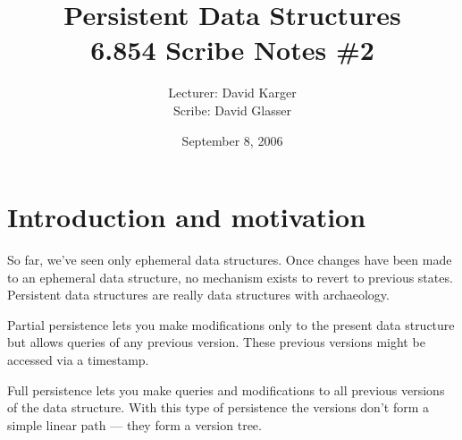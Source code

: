 \documentclass{article}
\title{Persistent Data Structures\\ 6.854 Scribe Notes \#2}
\date{September 8, 2006}
\author{Lecturer: David Karger\\ Scribe: David Glasser}
\begin{document}
%

%
%
%
%

%


\section{Introduction and motivation}
\label{crp}

So far, we've seen only ephemeral data structures.  Once changes have been made to an
ephemeral data structure, no mechanism exists to revert to  previous states.  Persistent
data structures are really data structures with archaeology.

Partial persistence lets you make modifications only to the present data structure but
allows queries of any previous version.  These previous versions might be accessed via
a timestamp.

Full persistence lets you make queries and modifications to all previous versions of the
data structure.  With this type of persistence the versions don't form a simple linear
path --- they form a version tree.
\end{document}
